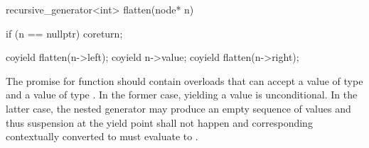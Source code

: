 \enterexample
\begin{codeblock}
  recursive_generator<int> flatten(node* n)
  {
    if (n == nullptr)
      coreturn;
    
    coyield flatten(n->left);
    coyield n->value;
    coyield flatten(n->right);
  }
\end{codeblock}

The promise for  function should contain overloads that can accept a value of type  and a value of type .
In the former case, yielding a value is unconditional. In the latter case, the nested generator may produce an empty sequence of values and thus suspension at the yield point shall not happen and corresponding  contextually converted to  must evaluate to . 
\exitexample